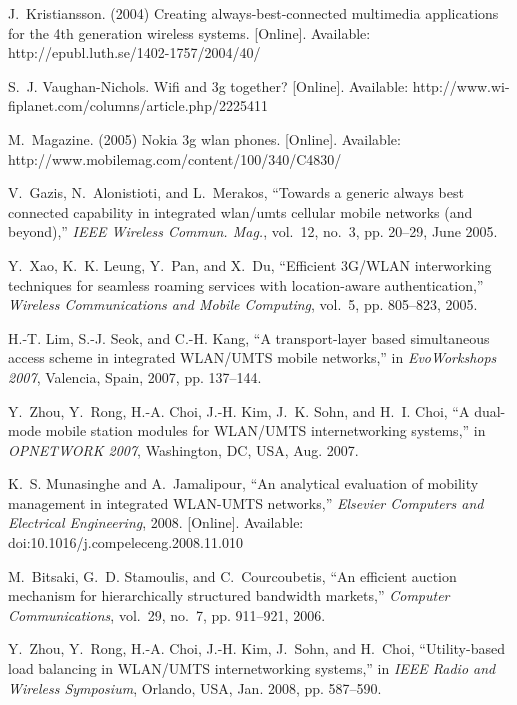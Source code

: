 \documentclass[a4paper]{article}
\begin{document}
\begin{thebibliography}{00}

J.~Kristiansson. (2004) Creating always-best-connected multimedia applications
  for the 4th generation wireless systems. [Online]. Available:
  http://epubl.luth.se/1402-1757/2004/40/

S.~J. Vaughan-Nichols. Wifi and 3g together? [Online]. Available:
  http://www.wi-fiplanet.com/columns/article.php/2225411

M.~Magazine. (2005) Nokia 3g wlan phones. [Online]. Available:
http://www.mobilemag.com/content/100/340/C4830/

V.~Gazis, N.~Alonistioti, and L.~Merakos, ``Towards a generic always best
  connected capability in integrated wlan/umts cellular mobile networks (and
  beyond),'' \emph{{IEEE} Wireless Commun. Mag.}, vol.~12, no.~3, pp. 20--29,
  June 2005.

Y.~Xao, K.~K. Leung, Y.~Pan, and X.~Du, ``Efficient 3G/WLAN interworking
  techniques for seamless roaming services with location-aware
  authentication,'' \emph{Wireless Communications and Mobile Computing},
  vol.~5, pp. 805--823, 2005.

H.-T. Lim, S.-J. Seok, and C.-H. Kang, ``A transport-layer based simultaneous
  access scheme in integrated WLAN/UMTS mobile networks,'' in
  \emph{EvoWorkshops 2007}, Valencia, Spain, 2007, pp. 137--144.

Y.~Zhou, Y.~Rong, H.-A. Choi, J.-H. Kim, J.~K. Sohn, and H.~I. Choi, ``A
  dual-mode mobile station modules for WLAN/UMTS internetworking systems,'' in
  \emph{OPNETWORK 2007}, Washington, DC, USA, Aug. 2007.

K.~S. Munasinghe and A.~Jamalipour, ``An analytical evaluation of mobility
  management in integrated WLAN-UMTS networks,'' \emph{Elsevier Computers and
  Electrical Engineering}, 2008. [Online]. Available:
  doi:10.1016/j.compeleceng.2008.11.010

M.~Bitsaki, G.~D. Stamoulis, and C.~Courcoubetis, ``An efficient auction
  mechanism for hierarchically structured bandwidth markets,'' \emph{Computer
  Communications}, vol.~29, no.~7, pp. 911--921, 2006.

Y.~Zhou, Y.~Rong, H.-A. Choi, J.-H. Kim, J.~Sohn, and H.~Choi, ``Utility-based
  load balancing in WLAN/UMTS internetworking systems,'' in \emph{IEEE Radio
  and Wireless Symposium}, Orlando, USA, Jan. 2008, pp. 587--590.


\end{thebibliography}
\end{document}
